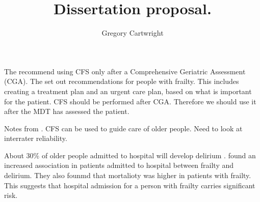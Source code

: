 \documentclass[12pt,a4paper,oneside,titlepage]{article}
\begin{document}
\author{Gregory Cartwright}
\title{Dissertation proposal.}
\maketitle
The \textcite[][page 8]{bgs:14} recommend using CFS only after a Comprehensive Geriatric Assessment (CGA).
The \textcite{bgs:14} set out recommendations for people with frailty. This includes creating a treatment plan and an urgent care plan, based on what is important for the patient.
CFS should be performed after CGA. Therefore we should use it after the MDT has assessed the patient.

Notes from \textcite{rockwood:05}. CFS can be used to guide care of older people. Need to look at interrater reliability.

About 30\% of older people admitted to hospital will develop delirium \parencite{clegg:13}. 
\textcite{eeles:12} found an increased association in patients admitted to hospital between frailty and delirium. 
They also founmd that mortalioty was higher in patients with frailty.
This suggests that hospital admission for a person with frailty carries significant risk.


\printbibliography[prenote=needsfixing]
\end{document}

